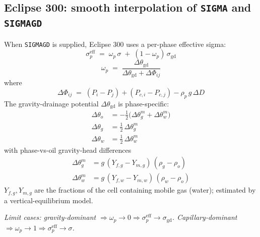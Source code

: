 \documentclass[11pt,a4paper]{article}
\newcommand{\kw}[1]{\texttt{#1}}
\newcommand{\note}[1]{\par\smallskip\textit{#1}\par\smallskip}
\begin{document}
\subsection*{Eclipse 300: smooth interpolation of \kw{SIGMA} and \kw{SIGMAGD}}
When \kw{SIGMAGD} is supplied, Eclipse 300 uses a per-phase effective sigma:
\begin{equation}
\sigma^{\text{eff}}_p \;=\; \omega_p\,\sigma \;+\; (1-\omega_p)\,\sigma_{\text{gd}}
\label{eq:sigma-eff}
\tag{TD 2.60}
\end{equation}
\begin{equation}
\omega_p \;=\; \frac{\Delta \theta_{\text{gd}}}{\Delta\theta_{\text{gd}} + \Delta\Phi_{ij}}
\label{eq:omega-p}
\tag{TD 2.61}
\end{equation}
where
\begin{equation}
\Delta\Phi_{ij} \;=\; (P_i - P_j) + (P_{c,i} - P_{c,j}) - \rho_p\,g\,\Delta D
\label{eq:dPhi}
\tag{TD 2.62}
\end{equation}
The gravity-drainage potential $\Delta\theta_{\text{gd}}$ is phase-specific:
\begin{align}
\Delta\theta_o &= -\tfrac{1}{2}\bigl(\Delta\theta_{g}^{m} + \Delta\theta_{w}^{m}\bigr)
\label{eq:dtheta-o}\tag{TD 2.63}\\
\Delta\theta_g &= \tfrac{1}{2}\,\Delta\theta_{g}^{m}
\label{eq:dtheta-g}\tag{TD 2.64}\\
\Delta\theta_w &= \tfrac{1}{2}\,\Delta\theta_{w}^{m}
\label{eq:dtheta-w}\tag{TD 2.65}
\end{align}
with phase-vs-oil gravity-head differences
\begin{align}
\Delta\theta_{g}^{m} &= g \, (Y_{f,g} - Y_{m,g}) \, (\rho_g - \rho_o)
\label{eq:dthetag-cell}\tag{TD 2.66}\\
\Delta\theta_{w}^{m} &= g \, (Y_{f,w} - Y_{m,w}) \, (\rho_w - \rho_o)
\label{eq:dthetaw-cell}\tag{TD 2.67}
\end{align}
$Y_{f,g},Y_{m,g}$ are the fractions of the cell containing mobile gas (water); estimated by a vertical-equilibrium model.
\note{Limit cases: gravity-dominant $\Rightarrow \omega_p \to 0 \Rightarrow \sigma^{\text{eff}}_p \to \sigma_{\text{gd}}$.
Capillary-dominant $\Rightarrow \omega_p \to 1 \Rightarrow \sigma^{\text{eff}}_p \to \sigma$.}

\end{document}
